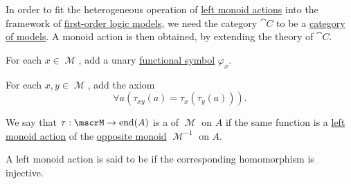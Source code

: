 \begin{remark}\label{rem:theory_of_left_monoid_actions}
  In order to fit the heterogeneous operation of \hyperref[def:left_monoid_action]{left monoid actions} into the framework of \hyperref[def:first_order_semantics/satisfiability]{first-order logic models}, we need the category \( \cat{C} \) to be a \hyperref[def:category_of_first_order_models]{category of models}. A monoid action is then obtained, by extending the theory of \( \cat{C} \).

  \begin{thmenum}
     For each \( x \in \mscrM \), add a unary \hyperref[def:first_order_language/func]{functional symbol} \( \varphi_x \).

     For each \( x, y \in \mscrM \), add the axiom
    \begin{equation}\label{eq:rem:theory_of_left_monoid_actions/axiom_schema}
      \forall a (\tau_{xy}(a) = \tau_x(\tau_y(a))).
    \end{equation}
  \end{thmenum}
\end{remark}

\begin{definition}\label{def:right_monoid_action}
  We say that \( \tau: \mscrM \to \End(A) \) is a  of \( \mscrM \) on \( A \) if the same function is a \hyperref[def:left_monoid_action]{left monoid action} of the \hyperref[def:magma/opposite]{opposite monoid} \( \mscrM^{-1} \) on \( A \).
\end{definition}

\begin{definition}\label{def:faithful_left_monoid_action}
  A left monoid action is said to be  if the corresponding homomorphism is injective.
\end{definition}

